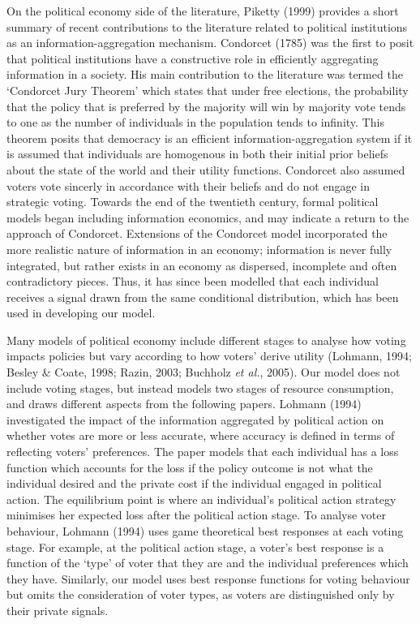 \documentclass[11pt,preprint, authoryear]{elsarticle}
\numberwithin{equation}{section}
\numberwithin{figure}{section}
\numberwithin{table}{section}
\begin{document}
On the political economy side of the literature, Piketty (1999) provides
a short summary of recent contributions to the literature related to
political institutions as an information-aggregation mechanism.
Condorcet (1785) was the first to posit that political institutions have
a constructive role in efficiently aggregating information in a society.
His main contribution to the literature was termed the `Condorcet Jury
Theorem' which states that under free elections, the probability that
the policy that is preferred by the majority will win by majority vote
tends to one as the number of individuals in the population tends to
infinity. This theorem posits that democracy is an efficient
information-aggregation system if it is assumed that individuals are
homogenous in both their initial prior beliefs about the state of the
world and their utility functions. Condorcet also assumed voters vote
sincerly in accordance with their beliefs and do not engage in strategic
voting. Towards the end of the twentieth century, formal political
models began including information economics, and may indicate a return
to the approach of Condorcet. Extensions of the Condorcet model
incorporated the more realistic nature of information in an economy;
information is never fully integrated, but rather exists in an economy
as dispersed, incomplete and often contradictory pieces. Thus, it has
since been modelled that each individual receives a signal drawn from
the same conditional distribution, which has been used in developing our
model.

Many models of political economy include different stages to analyse how
voting impacts policies but vary according to how voters' derive utility
(Lohmann, 1994; Besley \& Coate, 1998; Razin, 2003; Buchholz \emph{et
al.}, 2005). Our model does not include voting stages, but instead
models two stages of resource consumption, and draws different aspects
from the following papers. Lohmann (1994) investigated the impact of the
information aggregated by political action on whether votes are more or
less accurate, where accuracy is defined in terms of reflecting voters'
preferences. The paper models that each individual has a loss function
which accounts for the loss if the policy outcome is not what the
individual desired and the private cost if the individual engaged in
political action. The equilibrium point is where an individual's
political action strategy minimises her expected loss after the
political action stage. To analyse voter behaviour, Lohmann (1994) uses
game theoretical best responses at each voting stage. For example, at
the political action stage, a voter's best response is a function of the
`type' of voter that they are and the individual preferences which they
have. Similarly, our model uses best response functions for voting
behaviour but omits the consideration of voter types, as voters are
distinguished only by their private signals.
\end{document}
